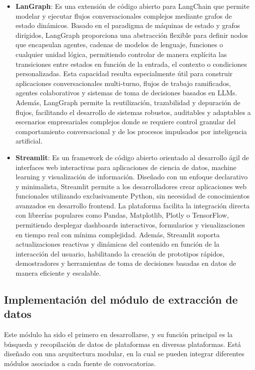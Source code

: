 \begin{itemize}
    \item \textbf{LanGraph}: Es una extensión de código abierto para LangChain que permite modelar y ejecutar flujos conversacionales complejos mediante grafos de estado dinámicos. 
    Basado en el paradigma de máquinas de estado y grafos dirigidos, LangGraph proporciona una abstracción flexible para definir nodos que encapsulan agentes, cadenas de modelos de lenguaje, funciones o cualquier unidad lógica, permitiendo controlar de manera explícita las transiciones entre estados en función de la entrada, el contexto o condiciones personalizadas. 
    Esta capacidad resulta especialmente útil para construir aplicaciones conversacionales multi-turno, flujos de trabajo ramificados, agentes colaborativos y sistemas de toma de decisiones basados en LLMs. 
    Además, LangGraph permite la reutilización, trazabilidad y depuración de flujos, facilitando el desarrollo de sistemas robustos, auditables y adaptables a escenarios empresariales complejos donde se requiere control granular del comportamiento conversacional y de los procesos impulsados por inteligencia artificial.
    
    \item \textbf{Streamlit}: Es un framework de código abierto orientado al desarrollo ágil de interfaces web interactivas para aplicaciones de ciencia de datos, machine learning y visualización de información. 
    Diseñado con un enfoque declarativo y minimalista, Streamlit permite a los desarrolladores crear aplicaciones web funcionales utilizando exclusivamente Python, sin necesidad de conocimientos avanzados en desarrollo frontend. 
    La plataforma facilita la integración directa con librerías populares como Pandas, Matplotlib, Plotly o TensorFlow, permitiendo desplegar dashboards interactivos, formularios y visualizaciones en tiempo real con mínima complejidad. 
    Además, Streamlit soporta actualizaciones reactivas y dinámicas del contenido en función de la interacción del usuario, habilitando la creación de prototipos rápidos, demostradores y herramientas de toma de decisiones basadas en datos de manera eficiente y escalable.
\end{itemize}



\subsection{Implementación del módulo de extracción de datos}

Este módulo ha sido el primero en desarrollarse, y su función principal es la búsqueda y recopilación de datos de plataformas en diversas plataformas.
Está diseñado con una arquitectura modular, en la cual se pueden integrar diferentes módulos asociados a cada fuente de convocatorias. 


